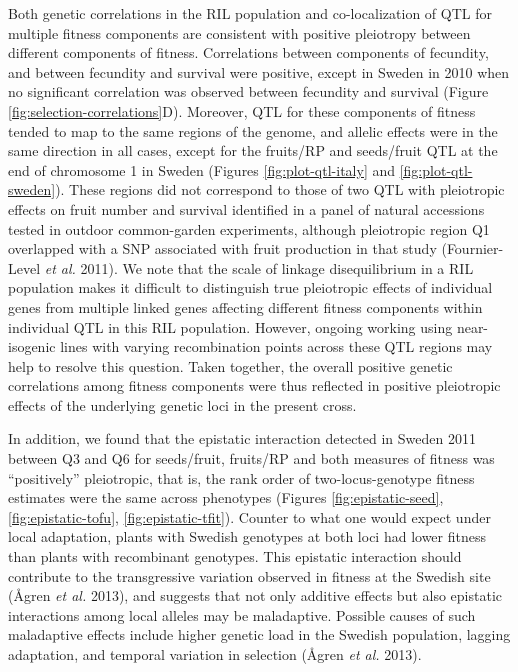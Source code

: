 \documentclass[]{article}
\begin{document}
Both genetic correlations in the RIL population and co-localization of QTL for multiple fitness components are consistent with positive pleiotropy between different components of fitness. Correlations between components of fecundity, and between fecundity and survival were positive, except in Sweden in 2010 when no significant correlation was observed between fecundity and survival (Figure \ref{fig:selection-correlations}D). Moreover, QTL for these components of fitness tended to map to the same regions of the genome, and allelic effects were in the same direction in all cases, except for the fruits/RP and seeds/fruit QTL at the end of chromosome 1 in Sweden (Figures \ref{fig:plot-qtl-italy} and \ref{fig:plot-qtl-sweden}). These regions did not correspond to those of two QTL with pleiotropic effects on fruit number and survival identified in a panel of natural accessions tested in outdoor common-garden experiments, although pleiotropic region Q1 overlapped with a SNP associated with fruit production in that study (Fournier-Level \emph{et al.} 2011). We note that the scale of linkage disequilibrium in a RIL population makes it difficult to distinguish true pleiotropic effects of individual genes from multiple linked genes affecting different fitness components within individual QTL in this RIL population. However, ongoing working using near-isogenic lines with varying recombination points across these QTL regions may help to resolve this question.
Taken together, the overall positive genetic correlations among fitness components were thus reflected in positive pleiotropic effects of the underlying genetic loci in the present cross.

In addition, we found that the epistatic interaction detected in Sweden 2011 between Q3 and Q6 for seeds/fruit, fruits/RP and both measures of fitness was ``positively'' pleiotropic, that is, the rank order of two-locus-genotype fitness estimates were the same across phenotypes (Figures \ref{fig:epistatic-seed}, \ref{fig:epistatic-tofu}, \ref{fig:epistatic-tfit}). Counter to what one would expect under local adaptation, plants with Swedish genotypes at both loci had lower fitness than plants with recombinant genotypes. This epistatic interaction should contribute to the transgressive variation observed in fitness at the Swedish site (Ågren \emph{et al.} 2013), and suggests that not only additive effects but also epistatic interactions among local alleles may be maladaptive. Possible causes of such maladaptive effects include higher genetic load in the Swedish population, lagging adaptation, and temporal variation in selection (Ågren \emph{et al.} 2013).
\end{document}
